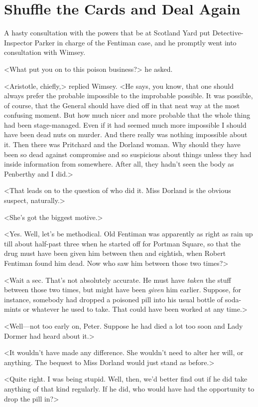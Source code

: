 \chapter{Shuffle the Cards and Deal Again}

\lettrine{A}{} hasty consultation with the powers that be at Scotland Yard put Detective-Inspector Parker in charge of the Fentiman case, and he promptly went into consultation with Wimsey.

\zz
<What put you on to this poison business?> he asked.

<Aristotle, chiefly,> replied Wimsey. <He says, you know, that one should always prefer the probable impossible to the improbable possible. It was possible, of course, that the General should have died off in that neat way at the most confusing moment. But how much nicer and more probable that the whole thing had been stage-managed. Even if it had seemed much more impossible I should have been dead nuts on murder. And there really was nothing impossible about it. Then there was Pritchard and the Dorland woman. Why should they have been so dead against compromise and so suspicious about things unless they had inside information from somewhere. After all, they hadn't seen the body as Penberthy and I did.>

<That leads on to the question of who did it. Miss Dorland is the obvious suspect, naturally.>

<She's got the biggest motive.>

<Yes. Well, let's be methodical. Old Fentiman was apparently as right as rain up till about half-past three when he started off for Portman Square, so that the drug must have been given him between then and eightish, when Robert Fentiman found him dead. Now who saw him between those two times?>

<Wait a sec. That's not absolutely accurate. He must have \emph{taken} the stuff between those two times, but might have been \emph{given} him earlier. Suppose, for instance, somebody had dropped a poisoned pill into his usual bottle of soda-mints or whatever he used to take. That could have been worked at any time.>

<Well—not too early on, Peter. Suppose he had died a lot too soon and Lady Dormer had heard about it.>

<It wouldn't have made any difference. She wouldn't need to alter her will, or anything. The bequest to Miss Dorland would just stand as before.>

<Quite right. I was being stupid. Well, then, we'd better find out if he did take anything of that kind regularly. If he did, who would have had the opportunity to drop the pill in?>

